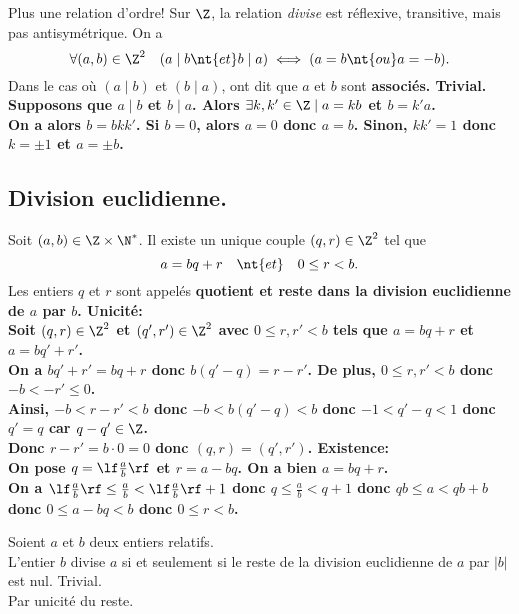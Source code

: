 \documentclass[11pt]{article}
\begin{document}
\begin{prop}{Plus une relation d'ordre!}{}
    Sur $\Z$, la relation \emph{divise} est réflexive, transitive, mais pas antisymétrique. On a
    \begin{equation*}
        \forall (a,b)\in\Z^2\quad(a\mid b \nt{ et } b \mid a) \iff (a=b \nt{ ou } a=-b).
    \end{equation*}
    Dans le cas où $(a\mid b)$ et $(b\mid a)$, ont dit que $a$ et $b$ sont \bf{associés}.
    \tcblower
    \fbox{$\la$} Trivial.\\
    \fbox{$\ra$} Supposons que $a\mid b$ et $b\mid a$. Alors $\exists k,k'\in\Z\mid a=kb$ et $b=k'a$.\\
    On a alors $b=bkk'$. Si $b=0$, alors $a=0$ donc $a=b$. Sinon, $kk'=1$ donc $k=\pm1$ et $a=\pm b$.
\end{prop}

\subsection{Division euclidienne.}

\begin{thm}{}{}
    Soit $(a,b)\in\Z\times\N^*$. Il existe un unique couple $(q,r)\in\Z^2$ tel que
    \begin{equation*}
        a=bq+r\quad\nt{et}\quad0\leq r < b.
    \end{equation*}
    Les entiers $q$ et $r$ sont appelés \bf{quotient} et \bf{reste} dans la division euclidienne de $a$ par $b$.
    \tcblower
    \bf{Unicité:}\\
    Soit $(q,r)\in\Z^2$ et $(q',r')\in\Z^2$ avec $0\leq r,r' <b$ tels que $a=bq+r$ et $a=bq'+r'$.\\
    On a $bq'+r'=bq+r$ donc $b(q'-q)=r-r'$. De plus, $0\leq r,r'<b$ donc $-b<-r'\leq0$.\\
    Ainsi, $-b<r-r'<b$ donc $-b<b(q'-q)<b$ donc $-1<q'-q<1$ donc $q'=q$ car $q-q'\in\Z$.\\
    Donc $r-r'=b\cdot0=0$ donc $(q,r)=(q',r')$.\n
    \bf{Existence:}\\
    On pose $q=\lf\frac{a}{b}\rf$ et $r=a-bq$. On a bien $a=bq+r$.\\
    On a $\lf\frac{a}{b}\rf\leq\frac{a}{b}<\lf\frac{a}{b}\rf+1$ donc $q\leq\frac{a}{b}<q+1$ donc $qb\leq a<qb+b$ donc $0\leq a-bq<b$ donc $0\leq r < b$.
\end{thm}

\begin{prop}{}{}
    Soient $a$ et $b$ deux entiers relatifs.\\
    L'entier $b$ divise $a$ si et seulement si le reste de la division euclidienne de $a$ par $|b|$ est nul.
    \tcblower
    \fbox{$\la$} Trivial.\\
    \fbox{$\ra$} Par unicité du reste.
\end{prop}
\end{document}
